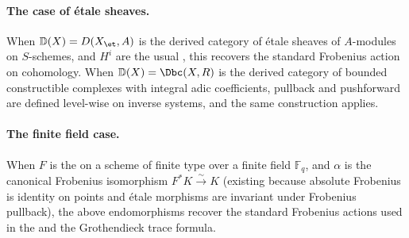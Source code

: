\begin{definition}
    \paragraph{The case of \'etale sheaves.} When $\mathbb{D}(X) = D(X_{\et}, A)$ is the derived category of \'etale sheaves of $A$-modules on $S$-schemes, and $H^i$ are the usual , this recovers the standard Frobenius action on cohomology. When $\mathbb{D}(X) = \Dbc(X, R)$ is the derived category of bounded constructible complexes with integral adic coefficients, pullback and pushforward are defined level-wise on inverse systems, and the same construction applies.

    \paragraph{The finite field case.} When $F$ is the  on a scheme of finite type over a finite field $\mathbb{F}_q$, and $\alpha$ is the canonical Frobenius isomorphism $F^*K \xrightarrow{\sim} K$ (existing because absolute Frobenius is identity on points and \'etale morphisms are invariant under Frobenius pullback), the above endomorphisms recover the standard Frobenius actions used in the  and the Grothendieck trace formula.
\end{definition}